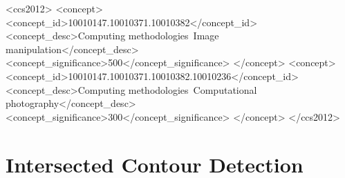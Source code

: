\documentclass[review]{acmsiggraph}
\begin{document}
\maketitle


\linenumbers

%
%
\begin{CCSXML}
<ccs2012>
<concept>
<concept_id>10010147.10010371.10010382</concept_id>
<concept_desc>Computing methodologies~Image manipulation</concept_desc>
<concept_significance>500</concept_significance>
</concept>
<concept>
<concept_id>10010147.10010371.10010382.10010236</concept_id>
<concept_desc>Computing methodologies~Computational photography</concept_desc>
<concept_significance>300</concept_significance>
</concept>
</ccs2012>
\end{CCSXML}


\keywordlist

\conceptlist

\printcopyright











\nocite{*}




\newpage

\appendix

\section{Intersected Contour Detection }
\end{document}
